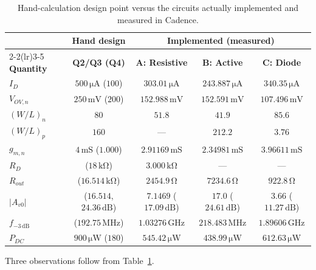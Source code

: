 \documentclass[12pt,a4paper]{article}
\newcommand{\U}[1]{\,\mathrm{#1}}
\begin{document}
\begin{table}[H]
\centering
\caption{Hand-calculation design point versus the circuits actually
implemented and measured in Cadence.}
\label{tab:handvsimpl}
\footnotesize
\begin{tabular}{lcccc}
\toprule
& \multicolumn{1}{c}{\textbf{Hand design}} & \multicolumn{3}{c}{\textbf{Implemented (measured)}} \\
\cmidrule(lr){2-2}\cmidrule(lr){3-5}
\textbf{Quantity} & \textbf{Q2/Q3 (Q4)} & \textbf{A: Resistive} & \textbf{B: Active} & \textbf{C: Diode} \\
\midrule
$I_D$            & $500\U{\mu A}$ ($100$) & $303.01\U{\mu A}$ & $243.887\U{\mu A}$ & $340.35\U{\mu A}$ \\
$V_{OV,n}$       & $250\U{mV}$ ($200$)    & $152.988\U{mV}$   & $152.591\U{mV}$    & $107.496\U{mV}$ \\
$(W/L)_n$        & $80$                   & $51.8$            & $41.9$             & $85.6$ \\
$(W/L)_p$        & $160$                  & ---               & $212.2$            & $3.76$ \\
$g_{m,n}$        & $4\U{mS}$ ($1.000$)    & $2.91169\U{mS}$   & $2.34981\U{mS}$    & $3.96611\U{mS}$ \\
$R_D$            & ($18\U{k\Omega}$)      & $3.000\U{k\Omega}$& ---                & --- \\
$R_{out}$        & ($16.514\U{k\Omega}$)  & $2454.9\U{\Omega}$& $7234.6\U{\Omega}$ & $922.8\U{\Omega}$ \\
$|A_{v0}|$       & ($16.514$, $24.36\U{dB}$) & $7.1469$ ($17.09\U{dB}$) & $17.0$ ($24.61\U{dB}$) & $3.66$ ($11.27\U{dB}$) \\
$f_{-3\U{dB}}$   & ($192.75\U{MHz}$)      & $1.03276\U{GHz}$  & $218.483\U{MHz}$   & $1.89606\U{GHz}$ \\
$P_{DC}$         & $900\U{\mu W}$ ($180$) & $545.42\U{\mu W}$ & $438.99\U{\mu W}$  & $612.63\U{\mu W}$ \\
\bottomrule
\end{tabular}
\end{table}

Three observations follow from Table~\ref{tab:handvsimpl}.
\end{document}
